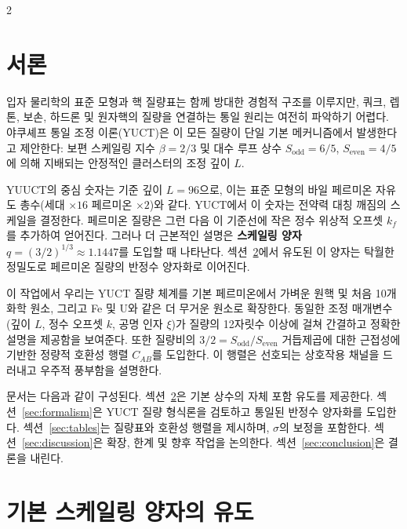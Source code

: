 \documentclass[11pt,a4paper]{article}
\begin{document}
	\begin{multicols}{2}
		
		\section{서론}
		
		입자 물리학의 표준 모형과 핵 질량표는 함께 방대한 경험적 구조를 이루지만, 쿼크, 렙톤, 보손, 하드론 및 원자핵의 질량을 연결하는 통일 원리는 여전히 파악하기 어렵다. 야쿠셰프 통일 조정 이론(YUCT)은 이 모든 질량이 단일 기본 메커니즘에서 발생한다고 제안한다: 보편 스케일링 지수 \(\beta = 2/3\) 및 대수 루프 상수 \(S_{\mathrm{odd}}=6/5\), \(S_{\mathrm{even}}=4/5\)에 의해 지배되는 안정적인 클러스터의 조정 깊이 \(L\).
		
		YUUCT의 중심 숫자는 기준 깊이 \(L = 96\)으로, 이는 표준 모형의 바일 페르미온 자유도 총수(세대 $\times 16$ 페르미온 $\times 2$)와 같다. YUCT에서 이 숫자는 전약력 대칭 깨짐의 스케일을 결정한다. 페르미온 질량은 그런 다음 이 기준선에 작은 정수 위상적 오프셋 \(k_f\)를 추가하여 얻어진다. 그러나 더 근본적인 설명은 \textbf{스케일링 양자} \(q = (3/2)^{1/3} \approx 1.1447\)를 도입할 때 나타난다. 섹션~\ref{sec:derivation}에서 유도된 이 양자는 탁월한 정밀도로 페르미온 질량의 반정수 양자화로 이어진다.
		
		이 작업에서 우리는 YUCT 질량 체계를 기본 페르미온에서 가벼운 원핵 및 처음 10개 화학 원소, 그리고 Fe 및 U와 같은 더 무거운 원소로 확장한다. 동일한 조정 매개변수(깊이 \(L\), 정수 오프셋 \(k\), 공명 인자 \(\xi\))가 질량의 12자릿수 이상에 걸쳐 간결하고 정확한 설명을 제공함을 보여준다. 또한 질량비의 \(3/2 = S_{\mathrm{odd}}/S_{\mathrm{even}}\) 거듭제곱에 대한 근접성에 기반한 정량적 호환성 행렬 \(C_{AB}\)를 도입한다. 이 행렬은 선호되는 상호작용 채널을 드러내고 우주적 풍부함을 설명한다.
		
		문서는 다음과 같이 구성된다. 섹션~\ref{sec:derivation}은 기본 상수의 자체 포함 유도를 제공한다. 섹션~\ref{sec:formalism}은 YUCT 질량 형식론을 검토하고 통일된 반정수 양자화를 도입한다. 섹션~\ref{sec:tables}는 질량표와 호환성 행렬을 제시하며, \(\sigma\)의 보정을 포함한다. 섹션~\ref{sec:discussion}은 확장, 한계 및 향후 작업을 논의한다. 섹션~\ref{sec:conclusion}은 결론을 내린다.
		
		\section{기본 스케일링 양자의 유도}
		\label{sec:derivation}
		

\end{multicols}
\end{document}

